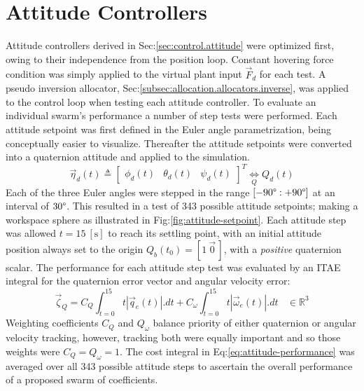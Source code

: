 \section{Attitude Controllers}
\label{sec:simulation.attitude}
Attitude controllers derived in Sec:\ref{sec:control.attitude} were optimized first, owing to their independence from the position loop. Constant hovering force condition was simply applied to the virtual plant input $\vec{F}_d$ for each test. A pseudo inversion allocator, Sec:\ref{subsec:allocation.allocators.inverse}, was applied to the control loop when testing each attitude controller. To evaluate an individual swarm's performance a number of step tests were performed. Each attitude setpoint was first defined in the Euler angle parametrization, being conceptually easier to visualize. Thereafter the attitude setpoints were converted into a quaternion attitude and applied to the simulation.
\begin{equation}
\vec{\eta}_d(t)\triangleq \begin{bmatrix}
\phi_d(t)&
\theta_d(t)&
\psi_d(t)
\end{bmatrix}^T\underset{Q}{\iff}Q_d(t)
\end{equation}
Each of the three Euler angles were stepped in the range $[-90\text{\textdegree}:+90\text{\textdegree}]$ at an interval of $30\text{\textdegree}$. This resulted in a test of 343 possible attitude setpoints; making a workspace sphere as illustrated in Fig:\ref{fig:attitude-setpoint}. Each attitude step was allowed $t=15~[\text{s}]$ to reach its settling point, with an initial attitude position always set to the origin $Q_b(t_0)=[1~\vec{0}\hspace{2pt}]$, with a \emph{positive} quaternion scalar. The performance for each attitude step test was evaluated by an ITAE integral for the quaternion error vector and angular velocity error:
\begin{equation}\label{eq:attitude-performance}
\vec{\zeta}_{Q}=C_Q\int_{t=0}^{15}t|\vec{q}_e(t)|.dt+C_\omega\int_{t=0}^{15}t|\vec{\omega}_e(t)|.dt~~~~\in\mathbb{R}^{3}
\end{equation}
Weighting coefficients $C_Q$ and $Q_\omega$ balance priority of either quaternion or angular velocity tracking, however, tracking both were equally important and so those weights were $C_Q=Q_\omega=1$. The cost integral in Eq:\ref{eq:attitude-performance} was averaged over all 343 possible attitude steps to ascertain the overall performance of a proposed swarm of coefficients.
